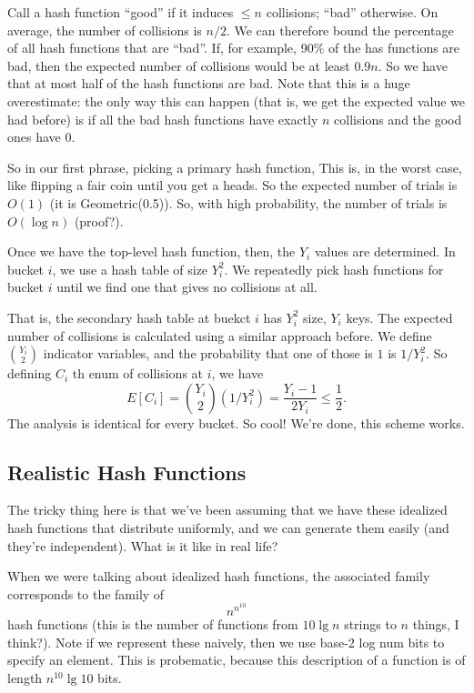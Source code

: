 \documentclass{article}
\begin{document}
Call a hash function ``good'' if it induces $\leq n$ collisions; ``bad'' otherwise.
On average, the number of collisions is $n/2$.
We can therefore bound the percentage of all hash functions that
are ``bad''.
If, for example, 90\% of the has functions are bad, then the expected
number of collisions would be at least $0.9n$.
So we have that at most half of the hash functions are bad.
Note that this is a huge overestimate: the only way
this can happen (that is, we get the expected value we had before)
 is if all the bad hash functions have exactly $n$ collisions and the
 good ones have $0$.

So in our first phrase, picking a primary hash function,
This is, in the worst case, like flipping a fair coin until you get
a heads.
So the expected number of trials is $O(1)$ (it is Geometric(0.5)).
So, with high probability, the number of trials is $O(\log n)$ (proof?).

Once we have the top-level hash function, then, the $Y_i$ values are determined.
In bucket $i$, we use a hash table of size $Y_i^2$.
We repeatedly pick hash functions for bucket $i$ until we find one
that gives no collisions at all.

That is, the secondary hash table at buekct $i$ has $Y_i^2$ size, $Y_i$ keys.
The expected number of collisions is calculated using a similar approach
before.
We define ${Y_i\choose 2}$ indicator variables, and the probability that
one of those is $1$ is $1 / Y_i^2$.
So defining $C_i$ th enum of collisions at $i$, we have
$$
E[C_i] = 
{Y_i\choose 2} (1 / Y_i^2)
=
\frac{Y_i - 1}{2Y_i}
\leq \frac{1}{2}.
$$
The analysis is identical for every bucket.
So cool! We're done, this scheme works.

\subsection{Realistic Hash Functions}

The tricky thing here is that we've been assuming that we have these
idealized hash functions that distribute uniformly, and we can generate
them easily (and they're independent).
What is it like in real life?


When we were talking about idealized hash functions, the associated
family corresponds to the family of
$$
n^{n^{10}}
$$
hash functions (this is the number of functions from $10\lg n$ strings to
$n$ things, I think?).
Note if we represent these naively, then we use base-2 log num bits to
specify an element.
This is probematic, because this description of a function is of 
length $n^{10}\lg 10$ bits.
\end{document}
